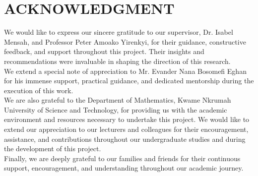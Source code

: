 \chapter*{ACKNOWLEDGMENT}
We would like to express our sincere gratitude to our supervisor, Dr. Isabel Mensah, and Professor Peter Amoako Yirenkyi, for their guidance, constructive feedback, and support throughout this project.
Their insights and recommendations were invaluable in shaping the direction of this research.\\

We extend a special note of appreciation to Mr. Evander Nana Bosomefi Eghan for his immense support, practical guidance, and dedicated mentorship during the execution of this work.\\

We are also grateful to the Department of Mathematics, Kwame Nkrumah University of Science and Technology, for providing us with the academic environment and resources necessary to undertake this project.
We would like to extend our appreciation to our lecturers and colleagues for their encouragement, assistance, and contributions throughout our undergraduate studies and during the development of this project.\\

Finally, we are deeply grateful to our families and friends for their continuous support, encouragement, and understanding throughout our academic journey.

